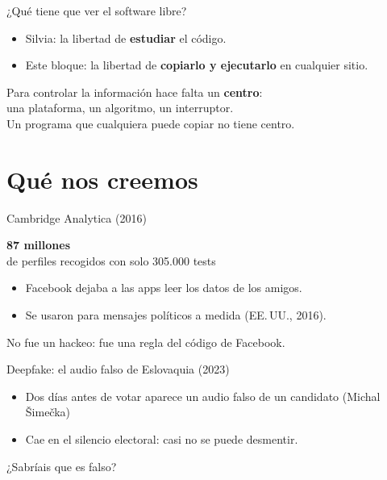 \documentclass[aspectratio=169,12pt]{beamer}
\def\navprev{}
\def\navnext{}
\newcommand{\nav}[2]{\gdef\navprev{#1}\gdef\navnext{#2}}
\newcommand{\cifra}[2]{%
  \begin{center}
    {\color{terra}\fontsize{36}{40}\selectfont\bfseries #1}\\[0.2cm]
    {\large #2}
  \end{center}}
\begin{document}
\nav{Tres decisiones}{Cambridge Analytica}
\begin{frame}{¿Qué tiene que ver el software libre?}
  \begin{itemize}
    \item Silvia: la libertad de \textbf{estudiar} el código.
    \item Este bloque: la libertad de \textbf{copiarlo y ejecutarlo} en cualquier sitio.
  \end{itemize}
  \vspace{0.6cm}
  \begin{center}
    {\large Para controlar la información hace falta un \textbf{centro}:\\
    una plataforma, un algoritmo, un interruptor.}\\[0.6cm]
    {\Large\alert{Un programa que cualquiera puede copiar no tiene centro.}}
  \end{center}
\end{frame}

\section{Qué nos creemos}
\nav{Software libre}{Deepfake en Eslovaquia}
\begin{frame}{Cambridge Analytica (2016)}
  \cifra{87 millones}{de perfiles recogidos con solo 305.000 tests}
  \begin{itemize}
    \item Facebook dejaba a las apps leer los datos de los amigos.
    \item Se usaron para mensajes políticos a medida (EE.\,UU., 2016).
  \end{itemize}
  \vspace{0.4cm}
  {\large\alert{No fue un hackeo: fue una regla del código de Facebook.}}
\end{frame}

\nav{Cambridge Analytica}{Deepfakes en Colombia}
\begin{frame}{Deepfake: el audio falso de Eslovaquia (2023)}
  \begin{itemize}
    \item Dos días antes de votar aparece un audio falso de un candidato (Michal Šimečka)
    \item Cae en el silencio electoral: casi no se puede desmentir.
  \end{itemize}
  \vspace{0.5cm}
  {\large\alert{¿Sabríais que es falso?}}
\end{frame}
\end{document}
